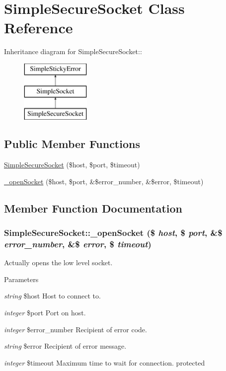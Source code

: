 \hypertarget{class_simple_secure_socket}{
\section{SimpleSecureSocket Class Reference}
\label{class_simple_secure_socket}
}
Inheritance diagram for SimpleSecureSocket::\begin{figure}[H]
\begin{center}
\leavevmode
\includegraphics[height=3cm]{class_simple_secure_socket}
\end{center}
\end{figure}
\subsection*{Public Member Functions}
\begin{DoxyCompactItemize}
\item 
\hyperlink{class_simple_secure_socket_ae86a1994aa38db0aad3ff3779c0907b7}{SimpleSecureSocket} (\$host, \$port, \$timeout)
\item 
\hyperlink{class_simple_secure_socket_ad027b44d55717c0baa0547cf66e0fa0f}{\_\-openSocket} (\$host, \$port, \&\$error\_\-number, \&\$error, \$timeout)
\end{DoxyCompactItemize}


\subsection{Member Function Documentation}
\hypertarget{class_simple_secure_socket_ad027b44d55717c0baa0547cf66e0fa0f}{
\subsubsection[{\_\-openSocket}]{\setlength{\rightskip}{0pt plus 5cm}SimpleSecureSocket::\_\-openSocket (\$ {\em host}, \/  \$ {\em port}, \/  \&\$ {\em error\_\-number}, \/  \&\$ {\em error}, \/  \$ {\em timeout})}}
\label{class_simple_secure_socket_ad027b44d55717c0baa0547cf66e0fa0f}
Actually opens the low level socket. 
\begin{DoxyParams}{Parameters}
\item[{\em string}]\$host Host to connect to. \item[{\em integer}]\$port Port on host. \item[{\em integer}]\$error\_\-number Recipient of error code. \item[{\em string}]\$error Recipient of error message. \item[{\em integer}]\$timeout Maximum time to wait for connection.  protected \end{DoxyParams}


